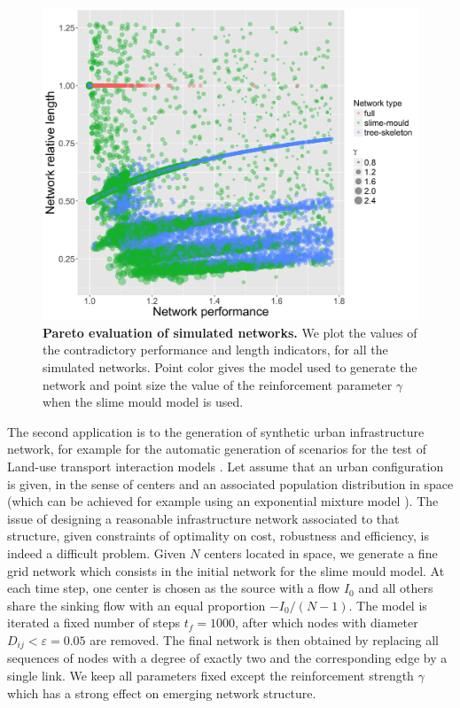 \documentclass[runningheads,a4paper]{llncs2e/llncs}
\begin{document}
\begin{figure}[h!]
	\includegraphics[width=1.2\linewidth]{figures/paretoSpeedLength.png}
	\caption{\textbf{Pareto evaluation of simulated networks.} We plot the values of the contradictory performance and length indicators, for all the simulated networks. Point color gives the model used to generate the network and point size the value of the reinforcement parameter $\gamma$ when the slime mould model is used.\label{fig:pareto}}
\end{figure}

The second application is to the generation of synthetic urban infrastructure network, for example for the automatic generation of scenarios for the test of Land-use transport interaction models \cite{wegener2004land}. Let assume that an urban configuration is given, in the sense of centers and an associated population distribution in space (which can be achieved for example using an exponential mixture model \cite{anas1998urban}). The issue of designing a reasonable infrastructure network associated to that structure, given constraints of optimality on cost, robustness and efficiency, is indeed a difficult problem. Given $N$ centers located in space, we generate a fine grid network which consists in the initial network for the slime mould model. At each time step, one center is chosen as the source with a flow $I_0$ and all others share the sinking flow with an equal proportion $-I_0 / (N - 1)$. The model is iterated a fixed number of steps $t_f = 1000$, after which nodes with diameter $D_{ij} < \varepsilon = 0.05$ are removed. The final network is then obtained by replacing all sequences of nodes with a degree of exactly two and the corresponding edge by a single link. We keep all parameters fixed except the reinforcement strength $\gamma$ which has a strong effect on emerging network structure.
\end{document}
